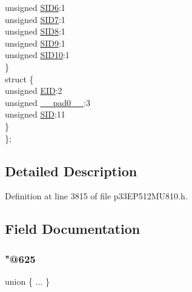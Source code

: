 \begin{DoxyCompactItemize}
\begin{tabbing}
\>\>unsigned \hyperlink{structtag_c1_r_x_f2_s_i_d_b_i_t_s_a70d70952133eb2389d5c326f9f0e8035}{SID6}:1\\
\>\>unsigned \hyperlink{structtag_c1_r_x_f2_s_i_d_b_i_t_s_a34097fb76decd431701fa2d86a22328e}{SID7}:1\\
\>\>unsigned \hyperlink{structtag_c1_r_x_f2_s_i_d_b_i_t_s_afe74894633244fdb0b0c01b4e8c522e7}{SID8}:1\\
\>\>unsigned \hyperlink{structtag_c1_r_x_f2_s_i_d_b_i_t_s_a33587704948067005c2a6a3ccc503c99}{SID9}:1\\
\>\>unsigned \hyperlink{structtag_c1_r_x_f2_s_i_d_b_i_t_s_a1a9084031c7f5fb16007feeebf0d8216}{SID10}:1\\
\>\} \\
\>struct \{\\
\>\>unsigned \hyperlink{structtag_c1_r_x_f2_s_i_d_b_i_t_s_ae80b378c9141f7c03e0b4e55b5f4b54d}{EID}:2\\
\>\>unsigned \hyperlink{structtag_c1_r_x_f2_s_i_d_b_i_t_s_adf71f3d8410c1f1dbbc96680a92c49af}{\_\_pad0\_\_}:3\\
\>\>unsigned \hyperlink{structtag_c1_r_x_f2_s_i_d_b_i_t_s_af88edf93b2fee2432665bd84f51287e4}{SID}:11\\
\>\} \\
\}; \\

\end{tabbing}\end{DoxyCompactItemize}


\subsection{Detailed Description}


Definition at line 3815 of file p33\+E\+P512\+M\+U810.\+h.



\subsection{Field Documentation}
\mbox{\label{structtag_c1_r_x_f2_s_i_d_b_i_t_s_a1668fa5c9f08f29f581d39470b41aea9}} 
\subsubsection{\texorpdfstring{"@625}{@625}}
{\footnotesize\ttfamily union \{ ... \} }

\mbox{\label{structtag_c1_r_x_f2_s_i_d_b_i_t_s_adf71f3d8410c1f1dbbc96680a92c49af}} 
